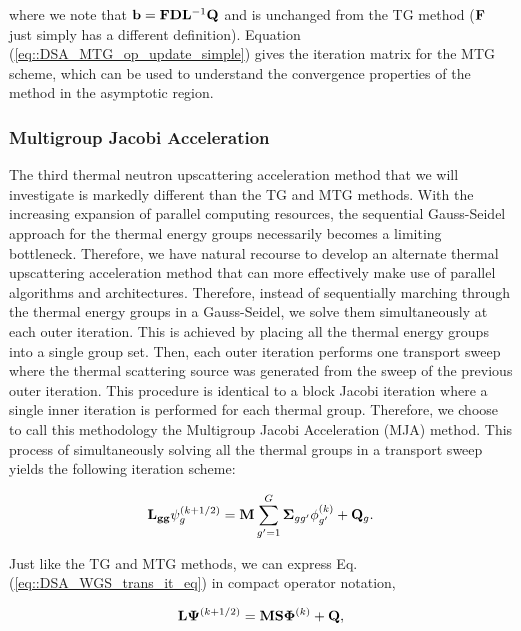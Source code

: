 \noindent where we note that ${\bf b}={\bf F} {\bf D}{\bf L}^{-1}  {\bf Q}$ and is unchanged from the TG method (${\bf F}$ just simply has a different definition). Equation (\ref{eq::DSA_MTG_op_update_simple}) gives the iteration matrix for the MTG scheme, which can be used to understand the convergence properties of the method in the asymptotic region. 

\subsubsection{Multigroup Jacobi Acceleration}
\label{sec:DSA_DSA_MG_WGS}

The third thermal neutron upscattering acceleration method that we will investigate is markedly different than the TG and MTG methods. With the increasing expansion of parallel computing resources, the sequential Gauss-Seidel approach for the thermal energy groups necessarily becomes a limiting bottleneck. Therefore, we have natural recourse to develop an alternate thermal upscattering acceleration method that can more effectively make use of parallel algorithms and architectures. Therefore, instead of sequentially marching through the thermal energy groups in a Gauss-Seidel, we solve them simultaneously at each outer iteration. This is achieved by placing all the thermal energy groups into a single group set. Then, each outer iteration performs one transport sweep where the thermal scattering source was generated from the sweep of the previous outer iteration. This procedure is identical to a block Jacobi iteration where a single inner iteration is performed for each thermal group. Therefore, we choose to call this methodology the Multigroup Jacobi Acceleration (MJA) method. This process of simultaneously solving all the thermal groups in a transport sweep yields the following iteration scheme:

\begin{equation}
\label{eq::DSA_WGS_trans_it_eq}
{\bf L_{gg}} \psi_g^{(k+1/2)} =  {\bf M} \sum_{g'=1}^G {\bf \Sigma}_{g g'} \phi_{g'}^{(k)} + {\bf Q}_g .
\end{equation}

\noindent Just like the TG and MTG methods, we can express Eq. (\ref{eq::DSA_WGS_trans_it_eq}) in compact operator notation,

\begin{equation}
\label{eq::DSA_WGS_trans_it_eq_ops}
{\bf L} {\bf \Psi}^{(k+1/2)} = {\bf M} {\bf S}  {\bf \Phi}^{(k)} + {\bf Q} ,
\end{equation}

